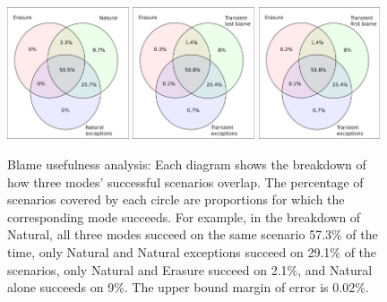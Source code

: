 \begin{figure}
  \centering
  \includegraphics[width=0.32\textwidth]{./plots/TR-TR-stack-first-venn}
  \hfill
  \includegraphics[width=0.32\textwidth]{./plots/transient-newest-transient-stack-first-venn}
  \hfill
  \includegraphics[width=0.32\textwidth]{./plots/transient-oldest-transient-stack-first-venn}

  \caption{Blame usefulness analysis: Each diagram shows the breakdown of how three modes' successful scenarios overlap.
  The percentage of scenarios covered by each circle are proportions for which the corresponding mode succeeds.
  For example, in the breakdown of Natural, all three modes succeed on the same scenario 57.3\% of the time, only Natural and Natural exceptions succeed on 29.1\% of the scenarios, only Natural and Erasure succeed on 2.1\%, and Natural alone succeeds on 9\%.
  The upper bound margin of error is 0.02\%.
  }
  \label{fig:success-venns}
\end{figure}


